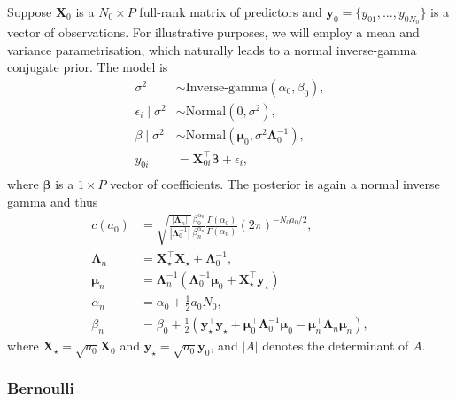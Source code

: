 \documentclass[a4paper, notitlepage, 11pt]{article}
\begin{document}
Suppose $\boldsymbol X_0$ is a $N_0 \times P$ full-rank matrix of predictors and $\boldsymbol y_0 = \{y_{01}, \ldots, y_{0N_0} \}$ is a vector of observations.
For illustrative purposes, we will employ a mean and variance parametrisation, which naturally leads to a normal inverse-gamma conjugate prior.
The model is 
\begin{align*}
 \sigma^2 &\sim \text{Inverse-gamma}(\alpha_0, \beta_0),\\
 \epsilon_i \mid \sigma^2  &\sim \text{Normal}(0, \sigma^2), \\
 \beta \mid \sigma^2 &\sim \text{Normal}(\boldsymbol \mu_0, \sigma^2\boldsymbol\Lambda_0^{-1}),\\
 y_{0i} &= \boldsymbol X_{0i}^\top \boldsymbol\beta + \epsilon_i, \\
\end{align*} 
where $\boldsymbol\beta$ is a $ 1 \times P$ vector of coefficients.
The posterior is again a normal inverse gamma and thus
\begin{align}
 \label{eq:cA0_regression}
c(a_0) &= \sqrt{\frac{|\boldsymbol\Lambda_n|}{|\boldsymbol\Lambda_0^{-1}|}} \frac{\beta_0^{\alpha_0}}{\beta_n^{\alpha_n}}\frac{\Gamma(\alpha_0)}{\Gamma(\alpha_n)}  (2\pi)^{-N_0 a_0/2},\\
\nonumber
\boldsymbol\Lambda_n &= \boldsymbol X_{\star}^\top\boldsymbol X_{\star} + \boldsymbol \Lambda_0^{-1}, \\
\nonumber
\boldsymbol\mu_n &= \boldsymbol\Lambda_n^{-1}\left(\boldsymbol\Lambda_0^{-1}\boldsymbol\mu_0 + \boldsymbol X_{\star}^\top\boldsymbol y_{\star} \right)  \\
\nonumber
\alpha_n &= \alpha_0 + \frac{1}{2}a_0N_0,\\
\nonumber
\beta_n &= \beta_0 + \frac{1}{2}\left( \boldsymbol y_{\star}^\top \boldsymbol y_{\star} + \boldsymbol \mu_0^\top \boldsymbol \Lambda_0^{-1} \boldsymbol \mu_0 - \boldsymbol\mu_n^\top \boldsymbol \Lambda_n \boldsymbol \mu_n  \right),
\end{align}
where $\boldsymbol X_{\star} = \sqrt{a_0} \boldsymbol X_0$ and $\boldsymbol y_{\star} = \sqrt{a_0} \boldsymbol y_0$, and $|A|$ denotes the determinant of $A$.

\subsubsection{Bernoulli}
\label{sec:bernoulli_ex}
\end{document}
